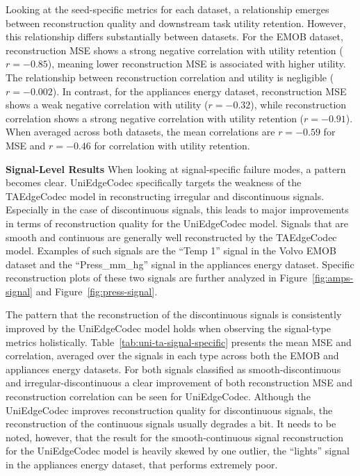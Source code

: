 Looking at the seed-specific metrics for each dataset, a relationship emerges between reconstruction quality and downstream task utility retention. However, this relationship differs substantially between datasets. For the EMOB dataset, reconstruction MSE shows a strong negative correlation with utility retention ($r = -0.85$), meaning lower reconstruction MSE is associated with higher utility. The relationship between reconstruction correlation and utility is negligible ($r = -0.002$). In contrast, for the appliances energy dataset, reconstruction MSE shows a weak negative correlation with utility ($r = -0.32$), while reconstruction correlation shows a strong negative correlation with utility retention ($r = -0.91$). When averaged across both datasets, the mean correlations are $r = -0.59$ for MSE and $r = -0.46$ for correlation with utility retention.

\textbf{Signal-Level Results} When looking at signal-specific failure modes, a pattern becomes clear. UniEdgeCodec specifically targets the weakness of the TAEdgeCodec model in reconstructing irregular and discontinuous signals. Especially in the case of discontinuous signals, this leads to major improvements in terms of reconstruction quality for the UniEdgeCodec model. Signals that are smooth and continuous are generally well reconstructed by the TAEdgeCodec model. Examples of such signals are the ``Temp 1'' signal in the Volvo EMOB dataset and the ``Press\_mm\_hg'' signal in the appliances energy dataset. Specific reconstruction plots of these two signals are further analyzed in Figure~\ref{fig:amps-signal} and Figure~\ref{fig:press-signal}.

The pattern that the reconstruction of the discontinuous signals is consistently improved by the UniEdgeCodec model holds when observing the signal-type metrics holistically. Table~\ref{tab:uni-ta-signal-specific} presents the mean MSE and correlation, averaged over the signals in each type across both the EMOB and appliances energy datasets. For both signals classified as smooth-discontinuous and irregular-discontinuous a clear improvement of both reconstruction MSE and reconstruction correlation can be seen for UniEdgeCodec. Although the UniEdgeCodec improves reconstruction quality for discontinuous signals, the reconstruction of the continuous signals usually degrades a bit. It needs to be noted, however, that the result for the smooth-continuous signal reconstruction for the UniEdgeCodec model is heavily skewed by one outlier, the ``lights'' signal in the appliances energy dataset, that performs extremely poor.

